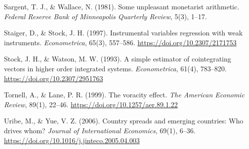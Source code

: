 \documentclass[11pt,a4paper]{article}
\begin{document}
Sargent, T. J., \& Wallace, N. (1981). Some unpleasant monetarist arithmetic. \textit{Federal Reserve Bank of Minneapolis Quarterly Review}, 5(3), 1--17.

Staiger, D., \& Stock, J. H. (1997). Instrumental variables regression with weak instruments. \textit{Econometrica}, 65(3), 557--586. \url{https://doi.org/10.2307/2171753}

Stock, J. H., \& Watson, M. W. (1993). A simple estimator of cointegrating vectors in higher order integrated systems. \textit{Econometrica}, 61(4), 783--820. \url{https://doi.org/10.2307/2951763}

Tornell, A., \& Lane, P. R. (1999). The voracity effect. \textit{The American Economic Review}, 89(1), 22--46. \url{https://doi.org/10.1257/aer.89.1.22}

Uribe, M., \& Yue, V. Z. (2006). Country spreads and emerging countries: Who drives whom? \textit{Journal of International Economics}, 69(1), 6--36. \url{https://doi.org/10.1016/j.jinteco.2005.04.003}

\par
\endgroup
\end{document}
